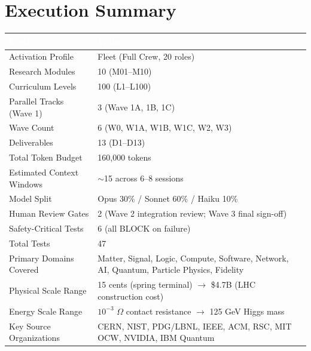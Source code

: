\documentclass[11pt,letterpaper]{article}
\newcommand{\tableheader}[1]{\textbf{\sffamily\textcolor{white}{#1}}}
\begin{document}
\section{Execution Summary}

\begin{center}
\begin{tabularx}{\textwidth}{L{5.5cm}X}
\toprule
{}
\tableheader{Metric} & \tableheader{Value} \\
\midrule
Activation Profile & Fleet (Full Crew, 20 roles) \\
Research Modules & 10 (M01--M10) \\
Curriculum Levels & 100 (L1--L100) \\
Parallel Tracks (Wave 1) & 3 (Wave 1A, 1B, 1C) \\
Wave Count & 6 (W0, W1A, W1B, W1C, W2, W3) \\
Deliverables & 13 (D1--D13) \\
Total Token Budget & 160,000 tokens \\
Estimated Context Windows & $\sim$15 across 6--8 sessions \\
Model Split & Opus 30\% / Sonnet 60\% / Haiku 10\% \\
Human Review Gates & 2 (Wave 2 integration review; Wave 3 final sign-off) \\
Safety-Critical Tests & 6 (all BLOCK on failure) \\
Total Tests & 47 \\
Primary Domains Covered & Matter, Signal, Logic, Compute, Software, Network, AI, Quantum, Particle Physics, Fidelity \\
Physical Scale Range & 15 cents (spring terminal) $\rightarrow$ \$4.7B (LHC construction cost) \\
Energy Scale Range & $10^{-3}$ $\Omega$ contact resistance $\rightarrow$ 125 GeV Higgs mass \\
Key Source Organizations & CERN, NIST, PDG/LBNL, IEEE, ACM, RSC, MIT OCW, NVIDIA, IBM Quantum \\
\bottomrule
\end{tabularx}
\end{center}

\vspace{2em}
\end{document}
